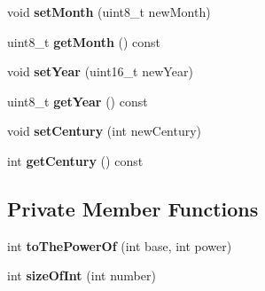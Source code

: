 \begin{DoxyCompactItemize}
\item 
\mbox{\label{classtimestamp_ac95d923ad675c4a2bff8b4b0384b6222}} 
void {\bfseries set\+Month} (uint8\+\_\+t new\+Month)
\item 
\mbox{\label{classtimestamp_a7225435b1a1ee20ae0dd8708f8e68ee8}} 
uint8\+\_\+t {\bfseries get\+Month} () const
\item 
\mbox{\label{classtimestamp_a2ad3d28f226c8f2ed74c06c609e29aff}} 
void {\bfseries set\+Year} (uint16\+\_\+t new\+Year)
\item 
\mbox{\label{classtimestamp_a21c6dd709bb29c95cea2641f26c6c088}} 
uint8\+\_\+t {\bfseries get\+Year} () const
\item 
\mbox{\label{classtimestamp_ad7c219bebf2b101f13f0a48e435ad888}} 
void {\bfseries set\+Century} (int new\+Century)
\item 
\mbox{\label{classtimestamp_a91ed1d395dd3d230607c4cb936b6004a}} 
int {\bfseries get\+Century} () const
\end{DoxyCompactItemize}
\subsection*{Private Member Functions}
\begin{DoxyCompactItemize}
\item 
\mbox{\label{classtimestamp_a34adc7a84c55ebf7d493fc095c5160f4}} 
int {\bfseries to\+The\+Power\+Of} (int base, int power)
\item 
\mbox{\label{classtimestamp_a9809b3f8756727082be42a1c4b241540}} 
int {\bfseries size\+Of\+Int} (int number)
\end{DoxyCompactItemize}
